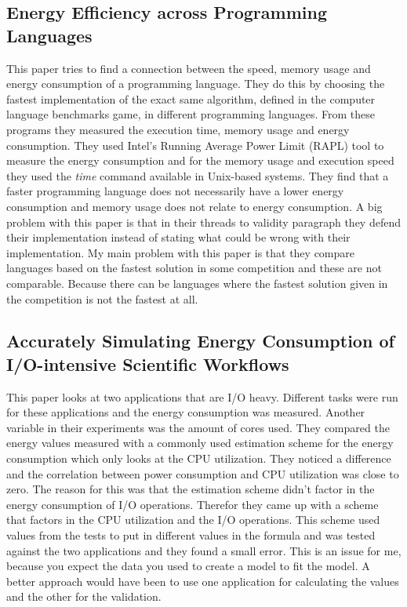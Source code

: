 \subsection{Energy Efficiency across Programming Languages
 \cite{pereira2017energy}}
 This paper tries to find a connection between the speed, memory usage and energy consumption of a programming language. They do this by choosing the fastest implementation of the exact same algorithm, defined in the computer language benchmarks game, in different programming languages. From these programs they measured the execution time, memory usage and energy consumption. They used Intel’s Running Average Power Limit (RAPL) tool to measure the energy consumption and for the memory usage and execution speed they used the \textit{time} command available in Unix-based systems. They find that a faster programming language does not necessarily have a lower energy consumption and memory usage does not relate to energy consumption. A big problem with this paper is that in their threads to validity paragraph they defend their implementation instead of stating what could be wrong with their implementation. My main problem with this paper is that they compare languages based on the fastest solution in some competition and these are not comparable. Because there can be languages where the fastest solution given in the competition is not the fastest at all.
 
 \subsection{Accurately Simulating Energy Consumption of I/O-intensive Scientific Workflows \cite{ferreiradasilva-iccs-2019}}
 This paper looks at two applications that are I/O heavy. Different tasks were run for these applications and the energy consumption was measured. Another variable in their experiments was the amount of cores used. They compared the energy values measured with a commonly used estimation scheme for the energy consumption which only looks at the CPU utilization. They noticed a difference and the correlation between power consumption and CPU utilization was close to zero. The reason for this was that the estimation scheme didn't factor in the energy consumption of I/O operations. Therefor they came up with a scheme that factors in the CPU utilization and the I/O operations. This scheme used values from the tests to put in different values in the formula and was tested against the two applications and they found a small error. This is an issue for me, because you expect the data you used to create a model to fit the model. A better approach would have been to use one application for calculating the values and the other for the validation.
 
